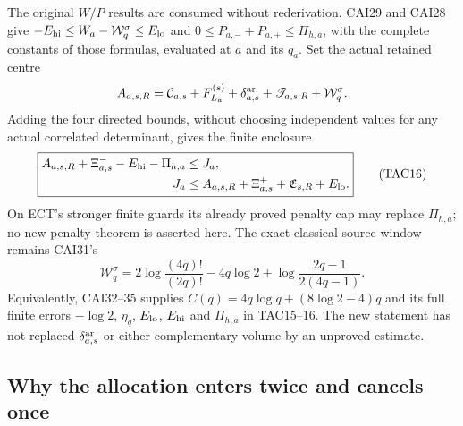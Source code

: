 \documentclass[11pt,a4paper]{article}
\begin{document}
The original $W/P$ results are consumed without rederivation.
CAI29 and CAI28 give
$-E_{\rm hi}\le W_a-\mathcal W_q^\sigma\le E_{\rm lo}$ and
$0\le P_{a,-}+P_{a,+}\le\Pi_{h,a}$, with the complete constants of
those formulas, evaluated at $a$ and its $q_a$.
Set the actual retained centre
\[
 A_{a,s,R}=\mathcal C_{a,s}+F_{L_a}^{(s)}
              +\delta_{a,s}^{\rm ar}+\mathscr T_{a,s,R}
              +\mathcal W_q^\sigma.
\]
Adding the four directed bounds, without choosing independent values
for any actual correlated determinant, gives the finite enclosure
\[
 \boxed{\begin{split}
 A_{a,s,R}+\Xi^-_{a,s}-E_{\rm hi}-\Pi_{h,a}
       &\le J_a,\\
 J_a&\le A_{a,s,R}+\Xi^+_{a,s}
                         +\mathfrak E_{s,R}+E_{\rm lo}.
 \end{split}}
 \tag{TAC16}
\]
On ECT's stronger finite guards its already proved penalty cap may
replace $\Pi_{h,a}$; no new penalty theorem is asserted here.
The exact classical-source window remains CAI31's
\[
 \mathcal W_q^\sigma
 =2\log\frac{(4q)!}{(2q)!}-4q\log2+
                         \log\frac{2q-1}{2(4q-1)}.
\]
Equivalently, CAI32--35 supplies $C(q)=4q\log q+(8\log2-4)q$
and its full finite errors $-\log2$, $\eta_q$, $E_{\rm lo}$,
$E_{\rm hi}$ and $\Pi_{h,a}$ in TAC15--16.  The new statement
has not replaced $\delta_{a,s}^{\rm ar}$ or either complementary
volume by an unproved estimate.

\subsection{Why the allocation enters twice and cancels once}
\end{document}

